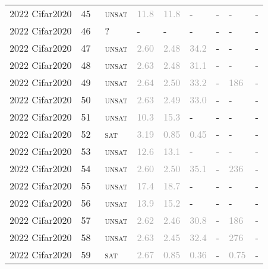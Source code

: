 \begin{center}
{\begin{longtable}{@{}lllllllll@{}}
2022 Cifar2020 & 45 & ~\textsc{unsat} & \textcolor{darkgray}{11.8} & \textcolor{darkgray}{11.8} & - & - & - & - \\
2022 Cifar2020 & 46 & ~? & - & - & - & - & - & - \\
2022 Cifar2020 & 47 & ~\textsc{unsat} & \textcolor{darkgray}{2.60} & \textcolor{darkgray}{2.48} & \textcolor{darkgray}{34.2} & - & - & - \\
2022 Cifar2020 & 48 & ~\textsc{unsat} & \textcolor{darkgray}{2.63} & \textcolor{darkgray}{2.48} & \textcolor{darkgray}{31.1} & - & - & - \\
2022 Cifar2020 & 49 & ~\textsc{unsat} & \textcolor{darkgray}{2.64} & \textcolor{darkgray}{2.50} & \textcolor{darkgray}{33.2} & - & \textcolor{darkgray}{186} & - \\
2022 Cifar2020 & 50 & ~\textsc{unsat} & \textcolor{darkgray}{2.63} & \textcolor{darkgray}{2.49} & \textcolor{darkgray}{33.0} & - & - & - \\
2022 Cifar2020 & 51 & ~\textsc{unsat} & \textcolor{darkgray}{10.3} & \textcolor{darkgray}{15.3} & - & - & - & - \\
2022 Cifar2020 & 52 & ~\textsc{sat} & \textcolor{darkgray}{3.19} & \textcolor{darkgray}{0.85} & \textcolor{darkgray}{0.45} & - & - & - \\
2022 Cifar2020 & 53 & ~\textsc{unsat} & \textcolor{darkgray}{12.6} & \textcolor{darkgray}{13.1} & - & - & - & - \\
2022 Cifar2020 & 54 & ~\textsc{unsat} & \textcolor{darkgray}{2.60} & \textcolor{darkgray}{2.50} & \textcolor{darkgray}{35.1} & - & \textcolor{darkgray}{236} & - \\
2022 Cifar2020 & 55 & ~\textsc{unsat} & \textcolor{darkgray}{17.4} & \textcolor{darkgray}{18.7} & - & - & - & - \\
2022 Cifar2020 & 56 & ~\textsc{unsat} & \textcolor{darkgray}{13.9} & \textcolor{darkgray}{15.2} & - & - & - & - \\
2022 Cifar2020 & 57 & ~\textsc{unsat} & \textcolor{darkgray}{2.62} & \textcolor{darkgray}{2.46} & \textcolor{darkgray}{30.8} & - & \textcolor{darkgray}{186} & - \\
2022 Cifar2020 & 58 & ~\textsc{unsat} & \textcolor{darkgray}{2.63} & \textcolor{darkgray}{2.45} & \textcolor{darkgray}{32.4} & - & \textcolor{darkgray}{276} & - \\
2022 Cifar2020 & 59 & ~\textsc{sat} & \textcolor{darkgray}{2.67} & \textcolor{darkgray}{0.85} & \textcolor{darkgray}{0.36} & - & \textcolor{darkgray}{0.75} & - \\

\end{longtable}}
\end{center}
